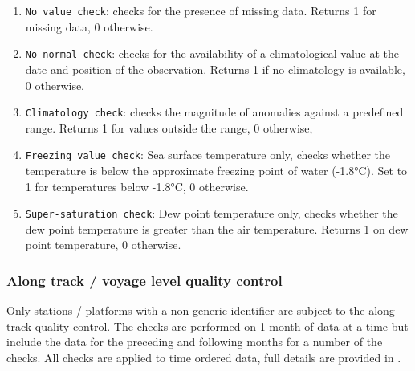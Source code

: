 \begin{enumerate}[resume]
\item \texttt{No value check}: checks for the presence of missing data. Returns 1 for missing data, 0 otherwise.
\item \texttt{No normal check}: checks for the availability of a climatological value at the date and position of the observation. Returns 1 if no climatology is available, 0 otherwise.
\item \texttt{Climatology check}: checks the magnitude of anomalies against a predefined range. Returns 1 for values outside the range, 0 otherwise,
\item \texttt{Freezing value check}: Sea surface temperature only, checks whether the temperature is below the approximate freezing point of water (-1.8°C). Set to 1 for temperatures below -1.8°C, 0 otherwise. 
\item \texttt{Super-saturation check}: Dew point temperature only, checks whether the dew point temperature is greater than the air temperature. Returns 1 on dew point temperature, 0 otherwise.
\end{enumerate}

\subsubsection{Along track / voyage level quality control} \label{track-qc}
Only stations / platforms with a non-generic identifier are subject to the along track quality control. The checks are performed on 1 month of data at a time but include the data for the preceding and following months for a number of the checks. All checks are applied to time ordered data, full details are provided in \cite{Kennedy2017}.

